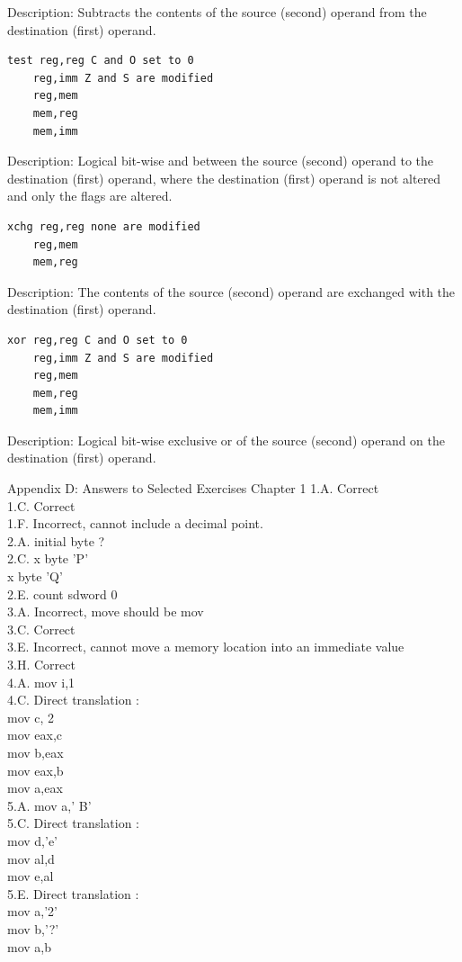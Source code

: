 \documentclass[10pt]{book}
\begin{document}
Description: Subtracts the contents of the source (second) operand from the destination (first) operand.

\begin{verbatim}
test reg,reg C and O set to 0
    reg,imm Z and S are modified
    reg,mem
    mem,reg
    mem,imm
\end{verbatim}

Description: Logical bit-wise and between the source (second) operand to the destination (first) operand, where the destination (first) operand is not altered and only the flags are altered.

\begin{verbatim}
xchg reg,reg none are modified
    reg,mem
    mem,reg
\end{verbatim}

Description: The contents of the source (second) operand are exchanged with the destination (first) operand.

\begin{verbatim}
xor reg,reg C and O set to 0
    reg,imm Z and S are modified
    reg,mem
    mem,reg
    mem,imm
\end{verbatim}

Description: Logical bit-wise exclusive or of the source (second) operand on the destination (first) operand.

Appendix D: Answers to Selected Exercises
Chapter 1
1.A. Correct\\
1.C. Correct\\
1.F. Incorrect, cannot include a decimal point.\\
2.A. initial byte ?\\
2.C. x byte 'P'\\
x byte 'Q'\\
2.E. count sdword 0\\
3.A. Incorrect, move should be mov\\
3.C. Correct\\
3.E. Incorrect, cannot move a memory location into an immediate value\\
3.H. Correct\\
4.A. mov i,1\\
4.C. Direct translation :\\
mov c, 2\\
mov eax,c\\
mov b,eax\\
mov eax,b\\
mov a,eax\\
5.A. mov a,' B'\\
5.C. Direct translation :\\
mov d,'e'\\
mov al,d\\
mov e,al\\
5.E. Direct translation :\\
mov a,'2'\\
mov b,'?'\\
mov a,b
\end{document}
